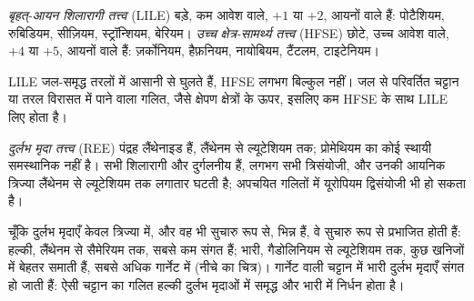 \begin{definition}[बृहत्-आयन शिलारागी और उच्च क्षेत्र-सामर्थ्य तत्त्व]
\label{def:b2:elements-in-the-earth:lile-hfse}
\emph{बृहत्-आयन शिलारागी तत्त्व}
(LILE) बड़े, कम आवेश वाले, $+1$ या $+2$, आयनों वाले  हैं:
पोटैशियम, रुबिडियम, सीज़ियम, स्ट्रॉन्शियम, बेरियम।
\emph{उच्च क्षेत्र-सामर्थ्य तत्त्व} (HFSE)
छोटे, उच्च आवेश वाले, $+4$ या $+5$, आयनों वाले  हैं:
ज़र्कोनियम, हैफ़नियम, नायोबियम, टैंटलम, टाइटेनियम।
\end{definition}

LILE जल-समृद्ध तरलों में आसानी से घुलते हैं, HFSE लगभग बिल्कुल नहीं। जल से
परिवर्तित चट्टान या तरल विरासत में पाने वाला गलित, जैसे क्षेपण क्षेत्रों के ऊपर,
इसलिए कम HFSE के साथ LILE लिए होता है।

\begin{definition}[दुर्लभ मृदा तत्त्व]\label{def:b2:elements-in-the-earth:ree}
\emph{दुर्लभ मृदा तत्त्व} (REE) पंद्रह
लैंथेनाइड हैं, लैंथेनम से ल्यूटेशियम तक; प्रोमेथियम का कोई स्थायी समस्थानिक नहीं है। सभी
शिलारागी और दुर्गलनीय हैं, लगभग सभी त्रिसंयोजी, और उनकी आयनिक त्रिज्या
लैंथेनम से ल्यूटेशियम तक लगातार घटती है; अपचयित गलितों में यूरोपियम
द्विसंयोजी भी हो सकता है।
\end{definition}

चूँकि दुर्लभ मृदाएँ केवल त्रिज्या में, और वह भी सुचारु रूप से, भिन्न हैं, वे
सुचारु रूप से प्रभाजित होती हैं: हल्की, लैंथेनम से सैमेरियम तक, सबसे कम
संगत हैं; भारी, गैडोलिनियम से ल्यूटेशियम तक, कुछ खनिजों में बेहतर समाती हैं,
सबसे अधिक गार्नेट में (नीचे का चित्र)। गार्नेट वाली चट्टान में भारी दुर्लभ
मृदाएँ संगत हो जाती हैं: ऐसी चट्टान का गलित हल्की दुर्लभ मृदाओं में समृद्ध और
भारी में निर्धन होता है।

